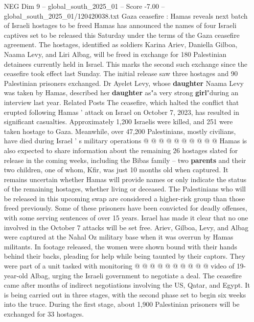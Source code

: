 \begin{textsample}{NEG Dim 9 – global\_south\_2025\_01 – Score -7.00 – global\_south\_2025\_01/120420038.txt}  \label{ex:f9_neg_139}
Gaza ceasefire : Hamas reveals next batch of Israeli hostages to be freed Hamas has announced the names of four Israeli captives set to be released this Saturday under the terms of the Gaza ceasefire agreement.
The hostages, identified as soldiers Karina Ariev, Daniella Gilboa, Naama Levy, and Liri Albag, will be freed in exchange for 180 Palestinian detainees currently held in Israel.
This marks the second such exchange since the ceasefire took effect last Sunday.
The initial release saw three hostages and 90 Palestinian prisoners exchanged.
Dr Ayelet Levy, whose \textbf{daughter} Naama Levy was taken by Hamas, described her \textbf{daughter} as"a very strong \textbf{girl}"during an interview last year.
Related Posts The ceasefire, which halted the conflict that erupted following Hamas ' attack on Israel on October 7, 2023, has resulted in significant casualties.
Approximately 1,200 Israelis were killed, and 251 were taken hostage to Gaza.
Meanwhile, over 47,200 Palestinians, mostly civilians, have died during Israel ' s military operations @ @ @ @ @ @ @ @ @ @ Hamas is also expected to share information about the remaining 26 hostages slated for release in the coming weeks, including the Bibas family -- two \textbf{parents} and their two children, one of whom, Kfir, was just 10 months old when captured.
It remains uncertain whether Hamas will provide names or only indicate the status of the remaining hostages, whether living or deceased.
The Palestinians who will be released in this upcoming swap are considered a higher-risk group than those freed previously.
Some of these prisoners have been convicted for deadly offenses, with some serving sentences of over 15 years.
Israel has made it clear that no one involved in the October 7 attacks will be set free.
Ariev, Gilboa, Levy, and Albag were captured at the Nahal Oz military base when it was overrun by Hamas militants.
In footage released, the women were shown bound with their hands behind their backs, pleading for help while being taunted by their captors.
They were part of a unit tasked with monitoring @ @ @ @ @ @ @ @ @ @ video of 19-year-old Albag, urging the Israeli government to negotiate a deal.
The ceasefire came after months of indirect negotiations involving the US, Qatar, and Egypt.
It is being carried out in three stages, with the second phase set to begin six weeks into the truce.
During the first stage, about 1,900 Palestinian prisoners will be exchanged for 33 hostages.

\end{textsample}
